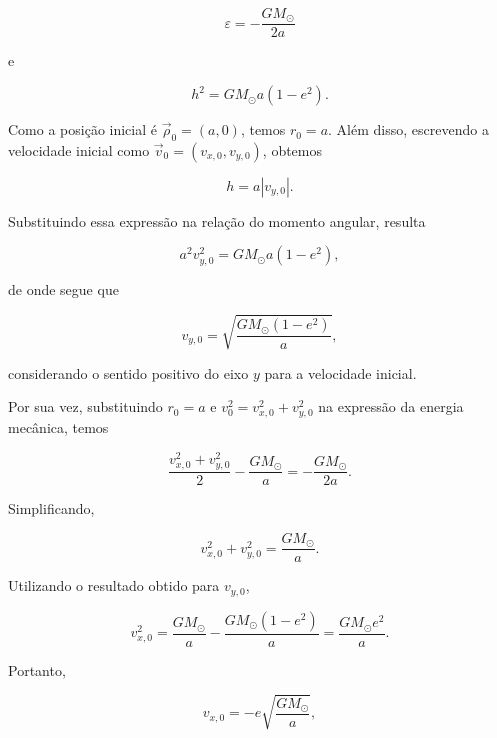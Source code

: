 \documentclass[12pt,a4paper]{article}
\begin{document}
\begin{equation}
    \varepsilon = -\frac{GM_{\odot}}{2a}
\end{equation}

e

\begin{equation}
    h^2 = GM_{\odot}a(1-e^2).
\end{equation}

Como a posição inicial é $\vec{\rho}_0=(a,0)$, temos $r_0=a$.
Além disso, escrevendo a velocidade inicial como
$\vec{v}_0=(v_{x,0},v_{y,0})$, obtemos

\begin{equation}
    h = a|v_{y,0}|.
\end{equation}

Substituindo essa expressão na relação do momento angular, resulta

\begin{equation}
    a^2v_{y,0}^2 = GM_{\odot}a(1-e^2),
\end{equation}

de onde segue que

\begin{equation}
    v_{y,0} = \sqrt{\frac{GM_{\odot}(1-e^2)}{a}},
\end{equation}

considerando o sentido positivo do eixo $y$ para a velocidade inicial.

Por sua vez, substituindo $r_0=a$ e
$v_0^2=v_{x,0}^2+v_{y,0}^2$ na expressão da energia mecânica,
temos

\begin{equation}
    \frac{v_{x,0}^2+v_{y,0}^2}{2}
    -\frac{GM_{\odot}}{a}
    =-\frac{GM_{\odot}}{2a}.
\end{equation}

Simplificando,

\begin{equation}
    v_{x,0}^2+v_{y,0}^2
    =\frac{GM_{\odot}}{a}.
\end{equation}

Utilizando o resultado obtido para $v_{y,0}$,

\begin{equation}
    v_{x,0}^2
    =\frac{GM_{\odot}}{a}
    -\frac{GM_{\odot}(1-e^2)}{a}
    =\frac{GM_{\odot}e^2}{a}.
\end{equation}

Portanto,

\begin{equation}
    v_{x,0}=-e\sqrt{\frac{GM_{\odot}}{a}},
\end{equation}
\end{document}
